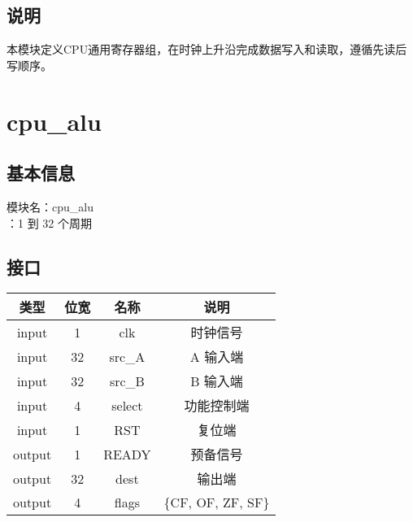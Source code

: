 \subsection{说明}
本模块定义CPU通用寄存器组，在时钟上升沿完成数据写入和读取，遵循先读后写顺序。

\section{cpu\_alu}
\subsection{基本信息}
模块名：cpu\_alu\\
：1 到 32 个周期
\subsection{接口}
\begin{tabular}{|c|c|c|c|}
    \hline
    类型       &   位宽    &   名称       &   说明\\\hline
    input      &    1      &    clk      &   时钟信号\\\hline 
    input      &   32      &   src\_A    &   A 输入端\\\hline
    input      &   32      &   src\_B    &   B 输入端\\\hline
    input      &   4       &    select   &   功能控制端\\\hline
    input       &   1       &    RST     &   复位端\\\hline
    output       &   1       &    READY  &   预备信号\\\hline
    output      &   32      &    dest    &   输出端\\\hline
    output      &   4       &    flags   &   \{CF, OF, ZF, SF\}\\\hline
\end{tabular}
